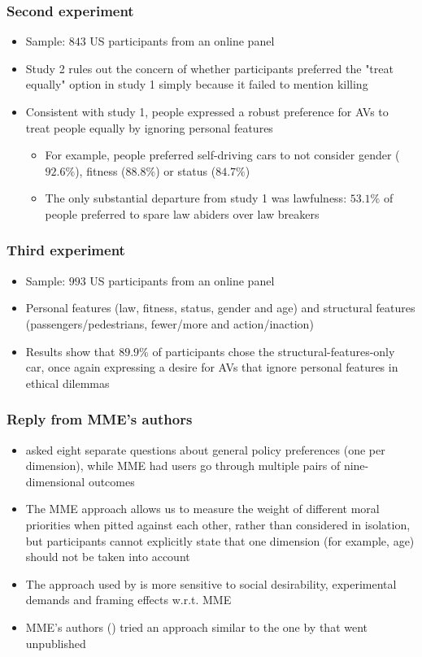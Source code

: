 \documentclass[aspectratio=169]{beamer}
\begin{document}
\begin{frame}
    \frametitle{Second experiment}
    \begin{itemize}
        \item Sample: $843$ US participants from an online panel
        \item Study 2 rules out the concern of whether participants preferred the "treat equally" option in study 1 simply because it failed to mention killing
        \item Consistent with study 1, people expressed a robust preference for AVs to treat people equally by ignoring personal features
        \begin{itemize}
            \item For example, people preferred self-driving cars to not consider gender ($92.6\%$), fitness ($88.8\%$) or status ($84.7\%$)
            \item The only substantial departure from study 1 was lawfulness: $53.1\%$ of people preferred to spare law abiders over law breakers
        \end{itemize}
    \end{itemize}
\end{frame}

\begin{frame}
    \frametitle{Third experiment}
    \begin{itemize}
        \item Sample: $993$ US participants from an online panel
        \item Personal features (law, fitness, status, gender and age) and structural features (passengers/pedestrians, fewer/more and action/inaction)
        \item Results show that $89.9\%$ of participants chose the structural-features-only car, once again expressing a desire for AVs that ignore personal features in ethical dilemmas
    \end{itemize}
\end{frame}

\begin{frame}
    \frametitle{Reply from MME's authors}
    \begin{itemize}
        \item \citeauthor{against-mme} asked eight separate questions about general policy preferences (one per dimension), while MME had users go through multiple pairs of nine-dimensional outcomes
        \item The MME approach allows us to measure the weight of different moral priorities when pitted against each other, rather than considered in isolation, but participants cannot explicitly state that one dimension (for example, age) should not be taken into account
        \item The approach used by \citeauthor{against-mme} is more sensitive to social desirability, experimental demands and framing effects w.r.t. MME
        \item MME's authors (\citeauthor{mme}) tried an approach similar to the one by \citeauthor{against-mme} that went unpublished
    \end{itemize}
\end{frame}
\end{document}
